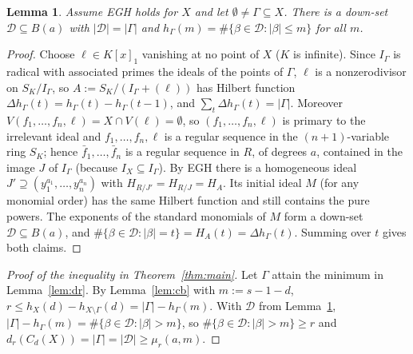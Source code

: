 \documentclass[11pt]{amsart}
\newtheorem{lemma}[theorem]{Lemma}
\theoremstyle{remark}
\theoremstyle{definition}
\begin{document}
\begin{lemma}\label{lem:downset}
Assume EGH holds for $X$ and let $\emptyset\ne\Gamma\subseteq X$. There is a down-set
$\mathcal D\subseteq B(a)$ with $|\mathcal D|=|\Gamma|$ and $h_\Gamma(m)=\#\{\beta\in\mathcal D:|\beta|\le m\}$ for
all $m$.
\end{lemma}
\begin{proof}
Choose $\ell\in K[x]_1$ vanishing at no point of $X$ ($K$ is infinite). Since $I_\Gamma$ is radical with
associated primes the ideals of the points of $\Gamma$, $\ell$ is a nonzerodivisor on $S_K/I_\Gamma$, so
$A:=S_K/(I_\Gamma+(\ell))$ has Hilbert function $\Delta h_\Gamma(t)=h_\Gamma(t)-h_\Gamma(t-1)$, and
$\sum_t\Delta h_\Gamma(t)=|\Gamma|$. Moreover $V(f_1,\dots,f_n,\ell)=X\cap V(\ell)=\emptyset$, so
$(f_1,\dots,f_n,\ell)$ is primary to the irrelevant ideal and $f_1,\dots,f_n,\ell$ is a regular sequence
in the $(n+1)$-variable ring $S_K$; hence $\bar f_1,\dots,\bar f_n$ is a regular sequence in $R$, of degrees
$a$, contained in the image $J$ of $I_\Gamma$ (because $I_X\subseteq I_\Gamma$). By EGH there is a
homogeneous ideal $J'\supseteq(y_1^{a_1},\dots,y_n^{a_n})$ with $H_{R/J'}=H_{R/J}=H_A$. Its initial ideal
$M$ (for any monomial order) has the same Hilbert function and still contains the pure powers. The
exponents of the standard monomials of $M$ form a down-set $\mathcal D\subseteq B(a)$, and
$\#\{\beta\in\mathcal D:|\beta|=t\}=H_A(t)=\Delta h_\Gamma(t)$. Summing over $t$ gives both claims.
\end{proof}

\begin{proof}[Proof of the inequality in Theorem~\ref{thm:main}]
Let $\Gamma$ attain the minimum in Lemma~\ref{lem:dr}. By Lemma~\ref{lem:cb} with $m:=s-1-d$,
$r\le h_X(d)-h_{X\setminus\Gamma}(d)=|\Gamma|-h_\Gamma(m)$. With $\mathcal D$ from
Lemma~\ref{lem:downset}, $|\Gamma|-h_\Gamma(m)=\#\{\beta\in\mathcal D:|\beta|>m\}$, so
$\#\{\beta\in\mathcal D:|\beta|>m\}\ge r$ and $d_r(C_d(X))=|\Gamma|=|\mathcal D|\ge\mu_r(a,m)$.
\end{proof}
\end{document}
